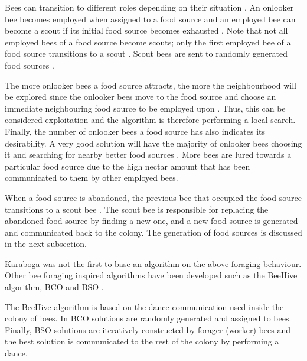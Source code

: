 Bees can transition to different roles depending on their situation \cite{ABCCompareStudy,ABCNumericalOptimization}. An onlooker bee becomes employed when assigned to a food source and an employed bee can become a scout if its initial food source becomes exhausted \cite{ABCImageEnhancement,ABCCompareStudy,ABCReconfigDistro}. Note that not all employed bees of a food source become scouts; only the first employed bee of a food source transitions to a scout \cite{ABCImageEnhancement,ABCCompareStudy,ABCReconfigDistro}. Scout bees are sent to randomly generated food sources \cite{ABCImageEnhancement,ABCCompareStudy,ABCReconfigDistro}. 

The more onlooker bees a food source attracts, the more the neighbourhood will be explored since the onlooker bees move to the food source and choose an immediate neighbouring food source to be employed upon \cite{ABCCompareStudy,ABCNumericalOptimization}. Thus, this can be considered exploitation and the algorithm is therefore performing a local search\cite{ABCCompareStudy,ABCReconfigDistro,ABCNumericalOptimization}. Finally, the number of onlooker bees a food source has also indicates its desirability. A very good solution will have the majority of onlooker bees choosing it and searching for nearby better food sources \cite{ABCCompareStudy,ABCReconfigDistro,ABCNumericalOptimization}. More bees are lured towards a particular food source due to the high nectar amount that has been communicated to them by other employed bees\cite{ABCCompareStudy,ABCReconfigDistro,ABCNumericalOptimization}.

When a food source is abandoned, the previous bee that occupied the food source transitions to a scout bee \cite{ABCCompareStudy,ABCNumericalOptimization}. The scout bee is responsible for replacing the abandoned food source by finding a new one, and a new food source is generated and communicated back to the colony\cite{ABCCompareStudy,ABCImageEnhancement,ABCNumericalOptimization}. The generation of food sources is discussed in the next subsection.

Karaboga was not the first to base an algorithm on the above foraging behaviour. Other bee foraging inspired algorithms have been developed such as the BeeHive algorithm, \gls{BCO} and \gls{BSO} \cite{BCO,HybridABCClustering,ABCNumericalOptimization}. 

The BeeHive algorithm is based on the dance communication used inside the colony of bees. In \gls{BCO} solutions are randomly generated and assigned to bees\cite{HybridABCClustering,ABCNumericalOptimization}. Finally, \gls{BSO} solutions are iteratively constructed by forager (worker) bees and the best solution is communicated to the rest of the colony by performing a dance\cite{HybridABCClustering,ABCNumericalOptimization}.

